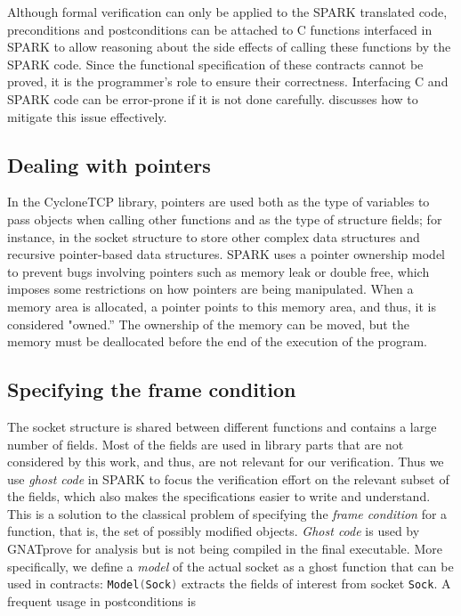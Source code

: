 \documentclass[conference]{IEEEtran}
\def\spark#1{\lstinline[language=Ada]{#1}}
\begin{document}
Although formal verification can only be applied to the SPARK translated code,  preconditions and postconditions can be attached to C functions interfaced in SPARK to allow reasoning about the side effects of calling these functions by the SPARK code. Since the functional specification of these contracts cannot be proved, it is the programmer's role to ensure their correctness. Interfacing C and SPARK code can be error-prone if it is not done carefully.  discusses how to mitigate this issue effectively.


\subsection{Dealing with pointers}
\label{sec:pointers}

In the CycloneTCP library, pointers are used both as the type of variables to pass objects when calling other functions and as the type of structure fields; for instance, in the socket structure to store other complex data structures and recursive pointer-based data structures. SPARK uses a pointer ownership model to prevent bugs involving pointers such as memory leak or double free, which imposes some restrictions on how pointers are being manipulated. When a memory area is allocated, a pointer points to this memory area, and thus, it is considered "owned.'' The ownership of the memory can be moved, but the memory must be deallocated before the end of the execution of the program.

\subsection{Specifying the frame condition}

The socket structure is shared between different functions and contains a large number of fields. Most of the fields are used in library parts that are not considered by this work, and thus, are not relevant for our verification. Thus we use \emph{ghost code} in SPARK to focus the verification effort on the relevant subset of the fields, which also makes the specifications easier to write and understand. This is a solution to the classical problem of specifying the \emph{frame condition} for a function, that is, the set of possibly modified objects. \emph{Ghost code} is used by GNATprove for analysis but is not being compiled in the final executable. More specifically, we define a \emph{model} of the actual socket as a ghost function that can be used in contracts: \spark{Model(Sock)} extracts the fields of interest from socket \spark{Sock}. A frequent usage in postconditions is
\end{document}
